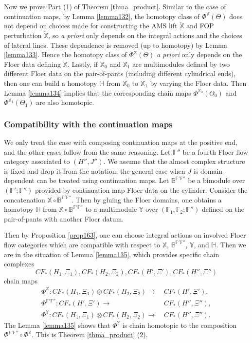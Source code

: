 \documentclass[reqno, 10pt]{amsart}
\numberwithin{equation}{section}
\numberwithin{equation}{section}
\theoremstyle{definition}
\theoremstyle{remark}
\newcommand{\beqn}{\begin{equation*}}
\newcommand{\eeqn}{\end{equation*}}
\newcommand{\mb}{\mathbb}
\begin{document}
Now we prove Part (1) of Theorem \ref{thma_product}. Similar to the case of continuation maps, by Lemma \ref{lemma132}, the homotopy class of $\Phi^{{\mb X}}(\Theta)$ does not depend on choices made for constructing the AMS lift $\tilde {\mb X}$ and FOP perturbation $\mathring {\mb X}$, so {\it a priori} only depends on the integral actions and the choices of lateral lines. These dependence is removed (up to homotopy) by Lemma \ref{lemma133}. Hence the homotopy class of $\Phi^{{\mb X}}(\Theta)$ {\it a priori} only depends on the Floer data defining ${\mb X}$. Lastly, if ${\mb X}_0$ and ${\mb X}_1$ are multimodules defined by two different Floer data on the pair-of-pants (including different cylindrical ends), then one can build a homotopy ${\mb H}$ from ${\mb X}_0$ to ${\mb X}_1$ by varying the Floer data. Then Lemma \ref{lemma134}  implies that the corresponding chain maps $\Phi^{{\mb X}_0}(\Theta_0)$ and $\Phi^{{\mb X}_1}(\Theta_1)$ are also homotopic.

\subsubsection{Compatibility with the continuation maps}

We only treat the case with composing continuation maps at the positive end, and the other cases follow from the same reasoning. Let ${\mb F}''$ be a fourth Floer flow category associated to $(H'', J'')$. We assume that the almost complex structure is fixed and drop it from the notation; the general case when $J$ is domain-dependent can be treated using continuation maps. Let $\mb{B}^{\mb{F}'\mb{F}''}$ be a bimodule over $({\mb F}'; {\mb F}'')$ provided by continuation map Floer data on the cylinder. Consider the concatenation ${\mb X} \circ \mb{B}^{\mb{F}'\mb{F}''}$. Then by gluing the Floer domains, one obtains a homotopy ${\mb H}$ from ${\mb X} \circ \mb{B}^{\mb{F}'\mb{F}''}$ to a multimodule ${\mb Y}$ over $({\mb F}_1, {\mb F}_2; {\mb F}'')$ defined on the pair-of-pants with another Floer datum. 

Then by Proposition \ref{prop163}, one can choose integral actions on involved Floer flow categories which are compatible with respect to $\mb{X}$, $\mb{B}^{\mb{F}'\mb{F}''}$, ${\mb Y}$, and ${\mb H}$. Then we are in the situation of Lemma \ref{lemma135}, which provides specific chain complexes 
\beqn
CF_*(H_1, \Xi_1), CF_*(H_2, \Xi_2), CF_*(H', \Xi'), CF_*(H'', \Xi'')
\eeqn
chain maps
\beqn
\begin{split}
\Phi^{\mb X}: CF_*(H_1, \Xi_1) \otimes CF_*(H_2, \Xi_2) \to &\ CF_*(H', \Xi'),\\
\Phi^{\mb{F}'\mb{F}''}: CF_*(H', \Xi') \to &\  CF_*(H'', \Xi''),\\
\Phi^{\mb Y}: CF_*(H_1, \Xi_1) \otimes CF_*(H_2, \Xi_2) \to &\ CF_*(H'', \Xi'').
\end{split}
\eeqn
The Lemma \ref{lemma135} shows that $\Phi^{\mb Y}$ is chain homotopic to the composition $\Phi^{\mb{F}'\mb{F}''} \circ \Phi^{\mb X}$. This is Theorem \ref{thma_product} (2). 
\end{document}
